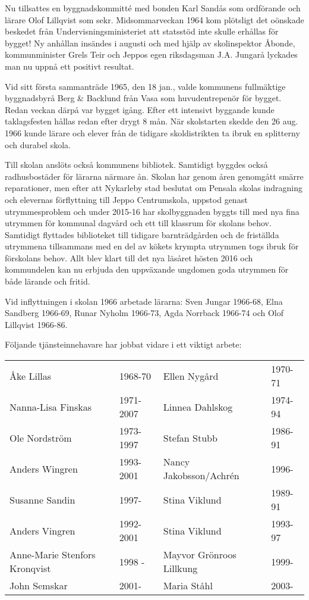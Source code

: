 Nu tillsattes en byggnadskommitté med bonden Karl Sandås som ordförande och lärare Olof Lillqvist som sekr. Midsommarveckan 1964 kom plötsligt det oönskade beskedet från Undervisningsministeriet att statsstöd inte skulle erhållas för bygget! Ny anhållan insändes i augusti och med hjälp av skolinspektor Åbonde, kommunminister Grels Teir och Jeppos egen riksdagsman J.A. Jungarå lyckades man nu uppnå ett positivt resultat.

Vid sitt första sammanträde 1965,  den 18 jan., valde kommunens fullmäktige byggnadsbyrå Berg \& Backlund från Vasa som huvudentrepenör för bygget. Redan veckan därpå var bygget igång. Efter ett intensivt byggande kunde taklagsfesten hållas redan efter drygt 8 mån. När skolstarten skedde den 26 aug. 1966 kunde lärare och elever från de tidigare skoldistrikten ta ibruk en splitterny och durabel skola.

Till skolan anslöts också kommunens bibliotek. Samtidigt byggdes också radhusbostäder för lärarna närmare ån. Skolan har genom åren genomgått smärre reparationer, men efter att Nykarleby stad beslutat om Pensala skolas indragning och elevernas förflyttning till Jeppo Centrumskola, uppstod genast utrymmesproblem och under 2015-16 har skolbyggnaden byggts till med nya fina utrymmen för kommunal dagvård och ett till klassrum för skolans behov. Samtidigt flyttades biblioteket till tidigare barnträdgården och de friställda utrymmena tillsammans med en del av kökets krympta  utrymmen togs ibruk för förskolans behov. Allt blev klart till det nya läsåret hösten 2016 och kommundelen kan nu erbjuda den uppväxande ungdomen goda utrymmen för både lärande och fritid.

Vid inflyttningen i skolan 1966 arbetade lärarna: Sven Jungar 1966-68, Elna Sandberg 1966-69, Runar Nyholm 1966-73, Agda Norrback 1966-74 och Olof Lillqvist 1966-86.

Följande tjänsteinnehavare har jobbat vidare i ett viktigt arbete:
\begin{center}
  \begin{tabular}{l l l l}
    \hline
    Åke Lillas & 1968-70 & Ellen Nygård & 1970-71 \\
    Nanna-Lisa Finskas & 1971-2007 &  Linnea Dahlskog & 1974-94 \\
    Ole Nordström & 1973-1997 & Stefan Stubb & 1986-91 \\
    Anders Wingren & 1993-2001 & Nancy Jakobsson/Achrén & 1996- \\
    Susanne Sandin & 1997-     & Stina Viklund & 1989-91 \\
    Anders Vingren & 1992-2001 & Stina Viklund & 1993-97 \\
    Anne-Marie Stenfors Kronqvist & 1998 - & Mayvor Grönroos Lillkung & 1999- \\
    John Semskar & 2001- & Maria Ståhl & 2003- \\
    \hline
  \end{tabular}
\end{center}

